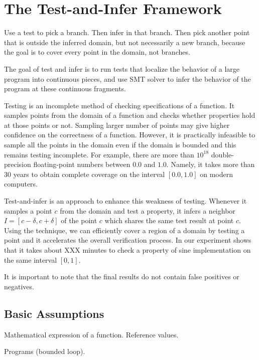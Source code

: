 \section{The Test-and-Infer Framework}

Use a test to pick a branch. Then infer in that branch. Then pick another point that is outside the inferred domain, but not necessarily a new branch, because the goal is to cover every point in the domain, not branches. 



The goal of test and infer is to run tests that localize the behavior of a large program into continuous pieces, and use SMT solver to infer the behavior of the program at these continuous fragments. 




Testing is an incomplete method of checking specifications of a
function. It samples points from the domain of a function and checks
whether properties hold at those points or not. Sampling larger number
of points may give higher confidence on the correctness of a function.
However, it is practically infeasible to sample all the points in the
domain even if the domain is bounded and this remains testing
incomplete. For example, there are more than $10^{18}$ double-precision
floating-point numbers between $0.0$ and $1.0$. Namely, it takes more than 30 years to obtain complete coverage on the interval $[0.0, 1.0]$ on modern computers.

Test-and-infer is an approach to enhance this weakness of testing.
Whenever it samples a point $c$ from the domain and test a property,
it infers a neighbor $I = [c - \delta, c + \delta]$ of the point $c$
which shares the same test result at point $c$. Using the technique,
we can efficiently cover a region of a domain by testing a point and
it accelerates the overall verification process. In our experiment
shows that it takes about XXX minutes to check a property of sine
implementation on the same interval $[0, 1]$.

It is important to note that the final results do not contain false positives or negatives. 

\subsection{Basic Assumptions}

Mathematical expression of a function. Reference values. 

Programs (bounded loop). 

